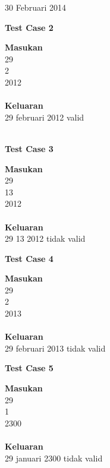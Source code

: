 \begin{permasalahan}{30 Februari 2014}
	\begin{center}
	\textbf{Test Case 2}\\
	\end{center}
	\textbf{Masukan}\\
	29 \\
	2 \\
	2012 \\\\
	\textbf{Keluaran}\\
	29 februari 2012 valid \\\\

	\begin{center}
	\textbf{Test Case 3}\\
	\end{center}
	\textbf{Masukan}\\
	29 \\
	13 \\
	2012 \\\\
	\textbf{Keluaran}\\
	29 13 2012 tidak valid
	
	\begin{center}
	\textbf{Test Case 4}\\
	\end{center}
	\textbf{Masukan}\\
	29 \\
	2 \\
	2013 \\\\
	\textbf{Keluaran}\\
	29 februari 2013 tidak valid \\
	
	\begin{center}
	\textbf{Test Case 5}\\
	\end{center}
	\textbf{Masukan}\\
	29 \\
	1 \\
	2300 \\\\
	\textbf{Keluaran}\\
	29 januari 2300 tidak valid \\
	
\end{permasalahan}


